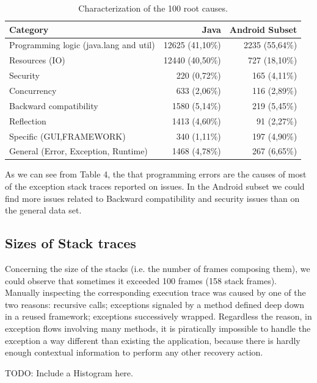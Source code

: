 \documentclass[conference]{IEEEtran}
\begin{document}
\begin{table}
  \centering
  \begin{tabular}{lrr}
    \hline
    \bfseries{Category} & \bfseries{Java} & \bfseries{Android Subset} \\
    \hline
      Programming logic (java.lang and util) & 12625	(41,10\%)	& 2235 (55,64\%)\\
      Resources (IO) & 12440 (40,50\%) & 727 (18,10\%) \\ 
      Security & 220	(0,72\%) & 165 (4,11\%)\\
      Concurrency	& 633 (2,06\%) & 116	(2,89\%)\\
      Backward compatibility & 1580 (5,14\%) & 219 (5,45\%) \\
      Reflection &1413 (4,60\%)   & 91 (2,27\%)\\
      Specific (GUI,FRAMEWORK) &	340	(1,11\%) & 197 (4,90\%)\\
      General (Error, Exception, Runtime) & 1468 (4,78\%) & 267 (6,65\%)\\
    \hline
  \end{tabular}
  \caption{Characterization of the 100 root causes.}
  \label{tab:tophundrend}
\end{table}

As we can see from Table 4, the that programming errors are the causes of most of the exception stack traces reported on issues. In the Android subset we could find more issues related to Backward compatibility and security issues than on the general data set.

\subsection{Sizes of Stack traces}

Concerning the size of the stacks (i.e. the number of frames composing them), we could observe that  sometimes it exceeded 100 frames (158 stack frames). Manually inspecting the corresponding execution trace was caused by one of the two reasons: recursive calls; exceptions signaled by a method defined deep down in a reused framework; exceptions successively wrapped. Regardless the reason, in exception flows involving many methods, it is piratically impossible to handle the exception a way different than existing the  application, because there is hardly enough contextual information to perform any other recovery action.

TODO: Include a Histogram here.


\end{document}
